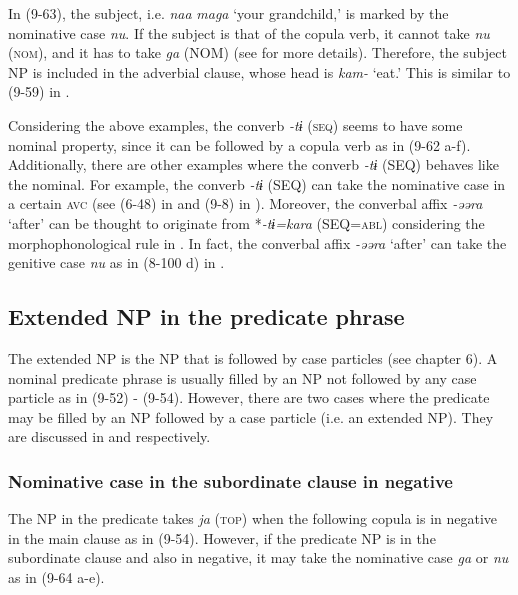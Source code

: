 In (9-63), the subject, i.e. \textit{naa} \textit{maga} ‘your grandchild,’ is marked by the nominative case \textit{nu}. If the subject is that of the copula verb, it cannot take \textit{nu} (\textsc{nom}), and it has to take \textit{ga} (NOM) (see  for more details). Therefore, the subject NP is included in the adverbial clause, whose head is \textit{kam-} ‘eat.’ This is similar to (9-59) in .

Considering the above examples, the converb \textit{{}-tɨ} (\textsc{seq}) seems to have some nominal property, since it can be followed by a copula verb as in (9-62 a-f). Additionally, there are other examples where the converb \textit{{}-tɨ} (SEQ) behaves like the nominal. For example, the converb \textit{{}-tɨ} (SEQ) can take the nominative case in a certain \textsc{avc} (see (6-48) in  and (9-8) in ). Moreover, the converbal affix \textit{{}-əəra} ‘after’ can be thought to originate from *\textit{{}-tɨ=kara} (SEQ=\textsc{abl}) considering the morphophonological rule in . In fact, the converbal affix \textit{{}-əəra} ‘after’ can take the genitive case \textit{nu} as in (8-100 d) in .

\subsection{Extended NP in the predicate phrase}\label{sec:9.3.3}

The extended NP is the NP that is followed by case particles (see chapter 6). A nominal predicate phrase is usually filled by an NP not followed by any case particle as in (9-52) - (9-54). However, there are two cases where the predicate may be filled by an NP followed by a case particle (i.e. an extended NP). They are discussed in  and  respectively.

\subsubsection{Nominative case in the subordinate clause in negative}\label{sec:9.3.3.1}

The NP in the predicate takes \textit{ja} (\textsc{top}) when the following copula is in negative in the main clause as in (9-54). However, if the predicate NP is in the subordinate clause and also in negative, it may take the nominative case \textit{ga} or \textit{nu} as in (9-64 a-e).

